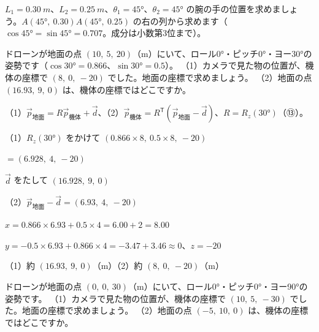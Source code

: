 \begin{jibun}
$L_1=\qty{0.30}{m}$、$L_2=\qty{0.25}{m}$、$\theta_1=45°$、$\theta_2=45°$ の腕の手の位置を求めましょう。$A(45°,\ 0.30)A(45°,\ 0.25)$ の右の列から求めます（$\cos45°=\sin45°=0.707$。成分は小数第3位まで）。
\end{jibun}

\begin{reidai}
ドローンが地面の点 $(10,\ 5,\ 20)$（m）にいて、ロール0°・ピッチ0°・ヨー30°の姿勢です（$\cos30°=0.866$、$\sin30°=0.5$）。\newline
（1）\nobreak カメラで見た物の位置が、機体の座標で $(8,\ 0,\ -20)$ でした。地面の座標で求めましょう。\newline
（2）\nobreak 地面の点 $(16.93,\ 9,\ 0)$ は、機体の座標ではどこですか。\par
\kangaekata （1）$\vec p_{\text{地面}}=R\vec p_{\text{機体}}+\vec d$、（2）$\vec p_{\text{機体}}=R^{\mathsf T}(\vec p_{\text{地面}}-\vec d)$、$R=R_z(30°)$（⑬）。\par
\shiki （1）\nobreak $R_z(30°)$ をかけて $(0.866\times8,\ 0.5\times8,\ -20)$\par
\kviihq \phantom{（1）}${}=(6.928,\ 4,\ -20)$\par
\kviihq \phantom{（1）}$\vec d$ をたして $(16.928,\ 9,\ 0)$\par
\kviihq （2）\nobreak $\vec p_{\text{地面}}-\vec d=(6.93,\ 4,\ -20)$\par
\kviihq \phantom{（2）}$x=0.866\times6.93+0.5\times4=6.00+2=8.00$\par
\kviihq \phantom{（2）}$y=-0.5\times6.93+0.866\times4=-3.47+3.46\approx0$、$z=-20$\par
\kotae （1）\nobreak 約 $(16.93,\ 9,\ 0)$（m）\quad（2）\nobreak 約 $(8,\ 0,\ -20)$（m）
\end{reidai}

\begin{jibun}
ドローンが地面の点 $(0,\ 0,\ 30)$（m）にいて、ロール0°・ピッチ0°・ヨー90°の姿勢です。\newline
（1）\nobreak カメラで見た物の位置が、機体の座標で $(10,\ 5,\ -30)$ でした。地面の座標で求めましょう。\newline
（2）\nobreak 地面の点 $(-5,\ 10,\ 0)$ は、機体の座標ではどこですか。
\end{jibun}

